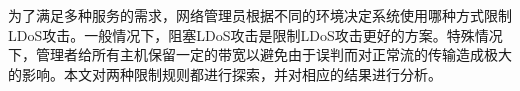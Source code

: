 
为了满足多种服务的需求，网络管理员根据不同的环境决定系统使用哪种方式限制LDoS攻击。一般情况下，阻塞LDoS攻击是限制LDoS攻击更好的方案。特殊情况下，管理者给所有主机保留一定的带宽以避免由于误判而对正常流的传输造成极大的影响。本文对两种限制规则都进行探索，并对相应的结果进行分析。

